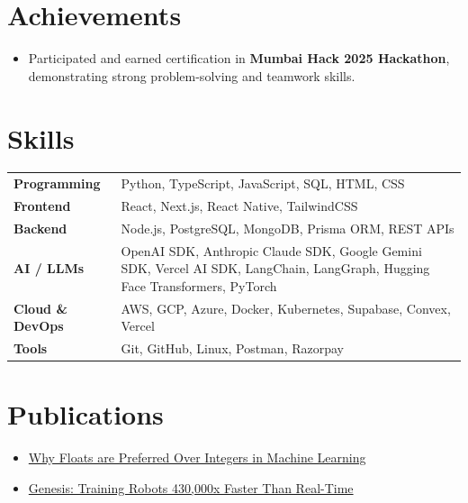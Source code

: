 \documentclass[11pt,letterpaper]{article}
\begin{document}
\section{Achievements}
\vspace{6pt}

\begin{itemize}
    \item Participated and earned certification in \textbf{Mumbai Hack 2025 Hackathon}, demonstrating strong problem-solving and teamwork skills.
\end{itemize}
\vspace{6pt}

\section{Skills}

\renewcommand{\arraystretch}{1.25}

\begin{tabularx}{\linewidth}{@{}lX@{}}

\textbf{Programming} &
Python, TypeScript, JavaScript, SQL, HTML, CSS \\

\textbf{Frontend} &
React, Next.js, React Native, TailwindCSS \\

\textbf{Backend} &
Node.js, PostgreSQL, MongoDB, Prisma ORM, REST APIs \\

\textbf{AI / LLMs} &
OpenAI SDK, Anthropic Claude SDK, Google Gemini SDK, Vercel AI SDK, LangChain, LangGraph, Hugging Face Transformers, PyTorch \\

\textbf{Cloud \& DevOps} &
AWS, GCP, Azure, Docker, Kubernetes, Supabase, Convex, Vercel \\

\textbf{Tools} &
Git, GitHub, Linux, Postman, Razorpay \\

\end{tabularx}


\section{Publications}

\begin{itemize}
    \item \href{https://medium.com/@saimanideep.ch12345/why-floats-are-preferred-over-integers-in-machine-learning-73da30ca2225}{Why Floats are Preferred Over Integers in Machine Learning}

    \item \href{https://medium.com/@saimanideep.ch12345/genesis-training-robots-430-000x-faster-than-real-time-c6b6775eee63}{Genesis: Training Robots 430,000x Faster Than Real-Time}
\end{itemize}
\end{document}
